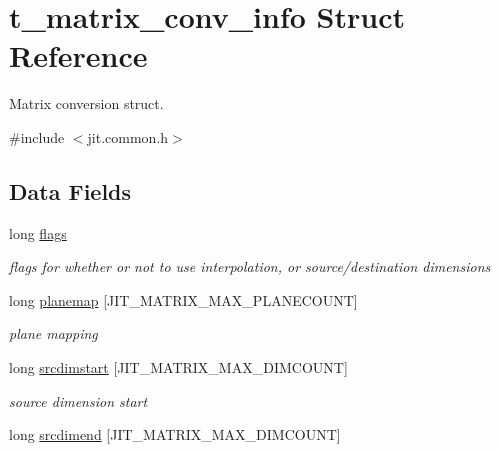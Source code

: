 \hypertarget{structt__matrix__conv__info}{
\section{t\_\-matrix\_\-conv\_\-info Struct Reference}
\label{structt__matrix__conv__info}
}


Matrix conversion struct.  


{\ttfamily \#include $<$jit.common.h$>$}\subsection*{Data Fields}
\begin{DoxyCompactItemize}
\item 
\hypertarget{structt__matrix__conv__info_a8c9883af7386bca409844a7ddc673cf2}{
long \hyperlink{structt__matrix__conv__info_a8c9883af7386bca409844a7ddc673cf2}{flags}}
\label{structt__matrix__conv__info_a8c9883af7386bca409844a7ddc673cf2}

\begin{DoxyCompactList}\small\item\em flags for whether or not to use interpolation, or source/destination dimensions \item\end{DoxyCompactList}\item 
\hypertarget{structt__matrix__conv__info_a146a141828ded3b89b8906a80abf30bd}{
long \hyperlink{structt__matrix__conv__info_a146a141828ded3b89b8906a80abf30bd}{planemap} \mbox{[}JIT\_\-MATRIX\_\-MAX\_\-PLANECOUNT\mbox{]}}
\label{structt__matrix__conv__info_a146a141828ded3b89b8906a80abf30bd}

\begin{DoxyCompactList}\small\item\em plane mapping \item\end{DoxyCompactList}\item 
\hypertarget{structt__matrix__conv__info_afd1cfbba1e08a281d871478776458eab}{
long \hyperlink{structt__matrix__conv__info_afd1cfbba1e08a281d871478776458eab}{srcdimstart} \mbox{[}JIT\_\-MATRIX\_\-MAX\_\-DIMCOUNT\mbox{]}}
\label{structt__matrix__conv__info_afd1cfbba1e08a281d871478776458eab}

\begin{DoxyCompactList}\small\item\em source dimension start \item\end{DoxyCompactList}\item 
\hypertarget{structt__matrix__conv__info_a623d341810d8d585d2c090df9410e60c}{
long \hyperlink{structt__matrix__conv__info_a623d341810d8d585d2c090df9410e60c}{srcdimend} \mbox{[}JIT\_\-MATRIX\_\-MAX\_\-DIMCOUNT\mbox{]}}
\label{structt__matrix__conv__info_a623d341810d8d585d2c090df9410e60c}


\end{DoxyCompactItemize}
